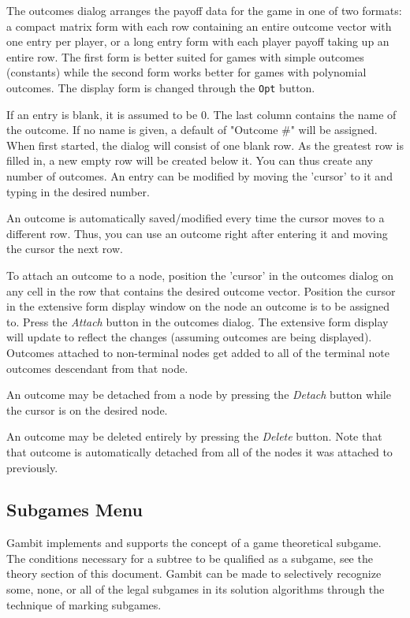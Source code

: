 The outcomes dialog arranges the payoff data for the game in one of two
formats: a compact matrix form with each row containing an entire outcome 
vector with one entry per player, or a long entry form with each player
payoff taking up an entire row.  The first form is better suited for games
with simple outcomes (constants) while the second form works better for games
with polynomial outcomes.  The display form is changed through the {\tt Opt}
 button.

If an entry is blank, it is assumed to be 0.  The last column
contains the name of the outcome.  If no name is given, a default of
"Outcome \#" will be assigned.  When first started, the dialog will consist
of one blank row.  As the greatest row is filled in, a new empty row will
be created below it.  You can thus create any number of outcomes.  An
entry can be modified by moving the 'cursor' to it and typing in the
desired number.

An outcome is automatically saved/modified every time the cursor moves to
a different row.  Thus, you can use an outcome right after entering it and
moving the cursor the next row.

To attach an outcome to a node, position the 'cursor' in the outcomes
dialog on any cell in the row that contains the desired outcome vector.
Position the cursor in the extensive form display window on the node an
outcome is to be assigned to.  Press the {\em Attach} button in the
outcomes dialog.  The extensive form display will update to reflect the
changes (assuming outcomes are being displayed).  Outcomes attached to
non-terminal nodes get added to all of the terminal note outcomes descendant
from that node.

An outcome may be detached from a node by pressing the {\em Detach} button
while the cursor is on the desired node.  

An outcome may be deleted entirely by pressing the {\em Delete} button.  Note
that that outcome is automatically detached from all of the nodes it was
attached to previously.


\subsection{Subgames Menu}\label{SubgamesMenu}
Gambit implements and supports the concept of a game theoretical
subgame. The 
conditions necessary for a subtree to be qualified as a subgame, see the 
theory section of this document.  Gambit can be made to selectively recognize some,  
none, or all of the legal subgames in its solution algorithms through 
the technique of marking subgames.  

